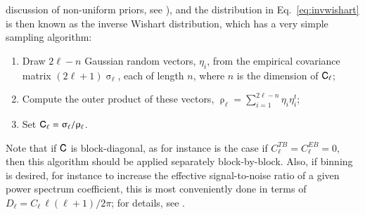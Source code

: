 \documentclass[onecolumn]{aa}
\renewcommand{\C}[0]{\tens{C}}
\begin{document}
discussion of non-uniform priors, see \citealp{larson:2006}), and the
distribution in Eq.~\eqref{eq:invwishart} is then known as the inverse
Wishart distribution, which has a very simple sampling algorithm:
\begin{enumerate}
  \item Draw $2\ell-n$ Gaussian random vectors, $\eta_i$, from the
    empirical covariance matrix $(2\ell+1)\upsigma_{\ell}$, each of
    length $n$, where $n$ is the dimension of $\C_{\ell}$;
  \item Compute the outer product of these vectors, $\uprho_{\ell} =
    \sum_{i=1}^{2\ell-n} \eta_i\eta_i^t$;
  \item Set $\C_{\ell} = \upsigma_\ell/\uprho_{\ell}$.
\end{enumerate}
Note that if $\C$ is block-diagonal, as for instance is the case if
$C_{\ell}^{TB} = C_{\ell}^{EB}=0$, then this algorithm should be
applied separately block-by-block. Also, if binning is desired, for
instance to increase the effective signal-to-noise ratio of a given
power spectrum coefficient, this is most conveniently done in terms of
$D_{\ell} = C_{\ell}\,\ell(\ell+1)/2\pi$; for details, see
\citet{larson:2006}.
\end{document}

